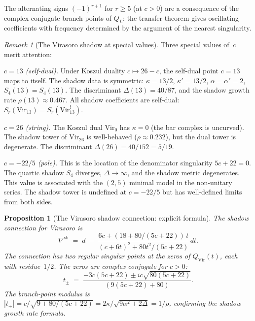 \documentclass[11pt,reqno]{amsart}
\newtheorem{proposition}[theorem]{Proposition}
\theoremstyle{definition}
\theoremstyle{remark}
\newtheorem{remark}[theorem]{Remark}
\newcommand{\Vir}{\mathrm{Vir}}
\numberwithin{equation}{section}
\begin{document}
\noindent The alternating signs $(-1)^{r+1}$ for $r \ge 5$
(at $c > 0$) are a consequence of the complex conjugate
branch points of $Q_L$: the transfer theorem gives
oscillating coefficients with frequency determined by the
argument of the nearest singularity.

\begin{remark}[The Virasoro shadow at special
values]\label{rem:virasoro-special}
Three special values of~$c$ merit attention:

\emph{$c = 13$ (self-dual).}\enspace
Under Koszul duality $c \mapsto 26 - c$,
the self-dual point $c = 13$ maps to itself. The shadow
data is symmetric: $\kappa = 13/2$, $\kappa' = 13/2$,
$\alpha = \alpha' = 2$, $S_4(13) = S_4(13)$.
The discriminant $\Delta(13) = 40/87$, and the
shadow growth rate $\rho(13) \approx 0.467$.
All shadow coefficients are self-dual:
$S_r(\Vir_{13}) = S_r(\Vir_{13}^!)$.

\emph{$c = 26$ (string).}\enspace
The Koszul dual $\Vir_0$ has $\kappa = 0$ (the bar complex
is uncurved). The shadow tower of $\Vir_{26}$ is
well-behaved ($\rho \approx 0.232$), but the dual tower is
degenerate. The discriminant $\Delta(26) = 40/152 = 5/19$.

\emph{$c = -22/5$ (pole).}\enspace
This is the location of the denominator singularity
$5c + 22 = 0$. The quartic shadow $S_4$ diverges,
$\Delta \to \infty$, and the shadow metric degenerates.
This value is associated with the $(2,5)$ minimal model
in the non-unitary series. The shadow tower is undefined at
$c = -22/5$ but has well-defined limits from both sides.
\end{remark}

\begin{proposition}[The Virasoro shadow connection:
explicit formula]\label{prop:virasoro-conn}
The shadow connection for Virasoro is
\begin{equation}\label{eq:virasoro-conn}
 \nabla^{\mathrm{sh}}
 \;=\;
 d \;-\;
 \frac{6c + (18 + 80/(5c+22))\, t}
 {(c + 6t)^2 + 80t^2/(5c+22)}\, dt.
\end{equation}
The connection has two regular singular points at the zeros
of $Q_{\Vir}(t)$, each with residue~$1/2$. The zeros are
complex conjugate for $c > 0$:
\[
 t_\pm
 \;=\;
 \frac{-3c(5c+22) \pm ic\sqrt{80(5c+22)}}
 {(9(5c+22) + 80)}.
\]
The branch-point modulus is
$|t_\pm| = c/\sqrt{9 + 80/(5c+22)}
= 2\kappa/\sqrt{9\alpha^2 + 2\Delta}
= 1/\rho$, confirming the shadow growth rate formula.
\end{proposition}
\end{document}
